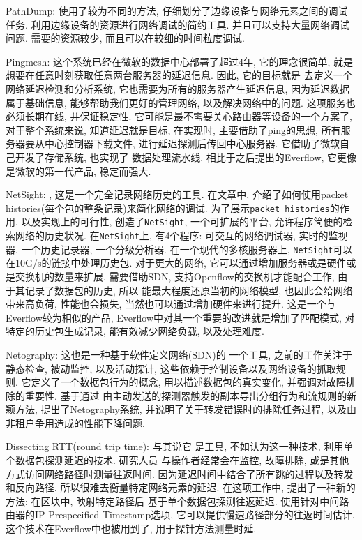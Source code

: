 PathDump: \cite{tammana2016simplifying}使用了较为不同的方法,
仔细划分了边缘设备与网络元素之间的调试任务.
利用边缘设备的资源进行网络调试的简约工具. 并且可以支持大量网络调试问题.
需要的资源较少, 而且可以在较细的时间粒度调试.

Pingmesh: \cite{guo2015pingmesh}
这个系统已经在微软的数据中心部署了超过4年, 它的理念很简单,
就是想要在任意时刻获取任意两台服务器的延迟信息. 因此, 它的目标就是
去定义一个网络延迟检测和分析系统, 它也需要为所有的服务器产生延迟信息,
因为延迟数据属于基础信息, 能够帮助我们更好的管理网络,
以及解决网络中的问题. 这项服务也必须长期在线, 并保证稳定性.
它可能是最不需要关心路由器等设备的一个方案了, 对于整个系统来说,
知道延迟就是目标, 在实现时, 主要借助了ping的思想,
所有服务器要从中心控制器下载文件, 进行延迟探测后传回中心服务器.
它借助了微软自己开发了存储系统, 也实现了 数据处理流水线.
相比于之后提出的Everflow, 它更像是微软的第一代产品, 稳定而强大.

NetSight: \cite{handigol2014know}, 这是一个完全记录网络历史的工具.
在文章中, 介绍了如何使用packet histories(每个包的整条记录)来简化网络的调试.
为了展示\texttt{packet\ histories}的作用, 以及实现上的可行性,
创造了\texttt{NetSight}, 一个可扩展的平台,
允许程序简便的检索网络的历史状况. 在\texttt{NetSight}上, 有4个程序:
可交互的网络调试器, 实时的监视器, 一个历史记录器, 一个分级分析器.
在一个现代的多核服务器上,
\texttt{NetSight}可以在10G/s的链接中处理历史包. 对于更大的网络,
它可以通过增加服务器或是硬件或是交换机的数量来扩展. 需要借助SDN,
支持Openflow的交换机才能配合工作, 由于其记录了数据包的历史, 所以
能最大程度还原当初的网络模型, 也因此会给网络带来高负荷, 性能也会损失,
当然也可以通过增加硬件来进行提升. 这是一个与Everflow较为相似的产品,
Everflow中对其一个重要的改进就是增加了匹配模式, 对特定的历史包生成记录,
能有效减少网络负载, 以及处理难度.

Netography: \cite{zhao2016netography} 这也是一种基于软件定义网络(SDN)的
一个工具, 之前的工作关注于静态检查, 被动监控, 以及活动探针,
这些依赖于控制设备以及网络设备的抓取规则. 它定义了一个数据包行为的概念,
用以描述数据包的真实变化, 并强调对故障排除的重要性. 基于通过
由主动发送的探测器触发的副本导出分组行为和流规则的新颖方法,
提出了Netography系统, 并说明了关于转发错误时的排除任务过程,
以及由非租户争用造成的性能下降问题.

Dissecting RTT(round trip time): \cite{marchetta2014dissecting} 与其说它
是工具, 不如认为这一种技术, 利用单个数据包探测延迟的技术. 研究人员
与操作者经常会在监控, 故障排除, 或是其他方式访问网络路径时测量往返时间.
因为延迟时间中结合了所有跳的过程以及转发和反向路径,
所以很难去衡量特定网络元素的延迟.
在这项工作中, 提出了一种新的方法: 在区块中, 映射特定路径后
基于单个数据包探测往返延迟. 使用针对中间路由器的IP Prespecified
Timestamp选项, 它可以提供慢速路径部分的往返时间估计.
这个技术在Everflow中也被用到了, 用于探针方法测量时延.

